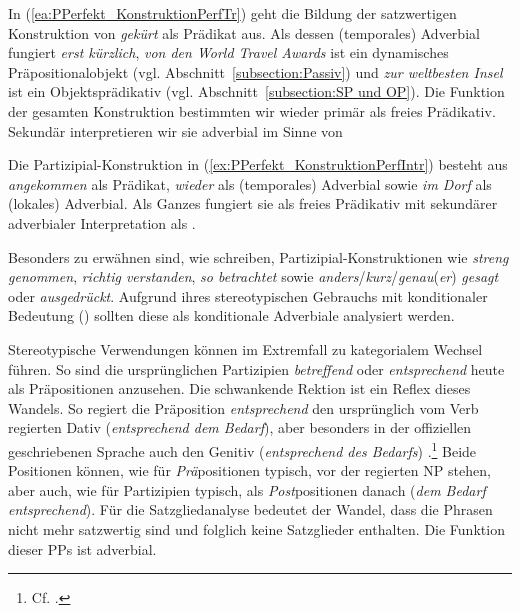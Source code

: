 In (\ref{ea:PPerfekt_KonstruktionPerfTr}) geht die Bildung der satzwertigen Konstruktion von \textit{gekürt} als Prädikat aus. Als dessen (temporales) Adverbial fungiert \textit{erst kürzlich}, \textit{von den World Travel Awards} ist ein dynamisches Präpositionalobjekt (vgl. Abschnitt~\ref{subsection:Passiv}) und \textit{zur weltbesten Insel} ist ein Objektsprädikativ (vgl. Abschnitt~\ref{subsection:SP und OP}). Die Funktion der gesamten Konstruktion bestimmten wir wieder primär als freies Prädikativ. Sekundär interpretieren wir sie adverbial im Sinne von  

Die Partizipial-Konstruktion in (\ref{ex:PPerfekt_KonstruktionPerfIntr}) besteht aus \textit{angekommen} als Prädikat, \textit{wieder} als (temporales) Adverbial sowie \textit{im Dorf} als (lokales) Adverbial. Als Ganzes fungiert sie als freies Prädikativ mit sekundärer adverbialer Interpretation als . 

Besonders zu erwähnen sind, wie \citet[588]{HelbigBuscha} schreiben,  Partizipial-Konstruktionen wie \textit{streng genommen}, \textit{richtig verstanden}, \textit{so betrachtet} sowie \textit{anders}/\textit{kurz}/\textit{genau}(\textit{er}) \textit{gesagt} oder \textit{ausgedrückt}. Aufgrund ihres stereotypischen Gebrauchs mit konditionaler Bedeutung () sollten diese als konditionale Adverbiale analysiert werden. 

Stereotypische Verwendungen können im Extremfall zu kategorialem Wechsel führen. So sind die ursprünglichen Partizipien \textit{betreffend} oder \textit{entsprechend} heute als Präpositionen anzusehen. Die schwankende Rektion ist ein Reflex dieses Wandels. So regiert die Präposition \textit{entsprechend} den ursprünglich vom Verb regierten Dativ (\textit{entsprechend dem Bedarf}), aber besonders in der offiziellen geschriebenen Sprache auch den Genitiv (\textit{entsprechend des Bedarfs}) .\footnote{Cf. \citet[818]{Duden2022}.} Beide Positionen können, wie für \textit{Prä}positionen typisch, vor der regierten NP stehen, aber auch, wie für Partizipien typisch, als \textit{Post}positionen danach (\textit{dem Bedarf entsprechend}). Für die Satzgliedanalyse bedeutet der Wandel, dass die Phrasen nicht mehr satzwertig sind und folglich keine Satzglieder enthalten. Die Funktion dieser PPs ist adverbial.

